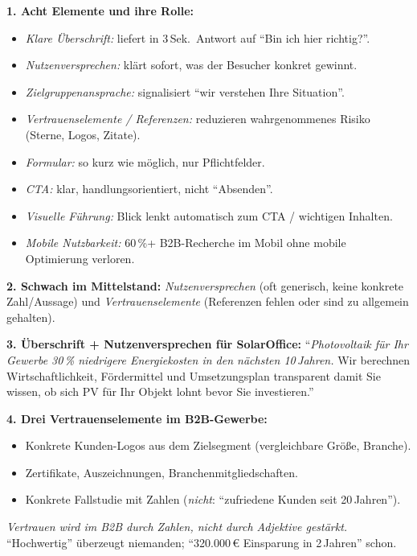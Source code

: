 \documentclass[11pt,a4paper,oneside]{article}
\begin{document}
\begin{loesungbox}
\textbf{1. Acht Elemente und ihre Rolle:}
\begin{itemize}
  \item \emph{Klare Überschrift:} liefert in 3\,Sek.\ Antwort auf ``Bin ich hier richtig?''.
  \item \emph{Nutzenversprechen:} klärt sofort, was der Besucher konkret gewinnt.
  \item \emph{Zielgruppenansprache:} signalisiert ``wir verstehen Ihre Situation''.
  \item \emph{Vertrauenselemente / Referenzen:} reduzieren wahrgenommenes Risiko (Sterne, Logos, Zitate).
  \item \emph{Formular:} so kurz wie möglich, nur Pflichtfelder.
  \item \emph{CTA:} klar, handlungsorientiert, nicht ``Absenden''.
  \item \emph{Visuelle Führung:} Blick lenkt automatisch zum CTA / wichtigen Inhalten.
  \item \emph{Mobile Nutzbarkeit:} 60\,\%+ B2B-Recherche im Mobil \textendash{} ohne mobile Optimierung verloren.
\end{itemize}

\textbf{2. Schwach im Mittelstand:}
\emph{Nutzenversprechen} (oft generisch, keine konkrete Zahl/Aussage) und \emph{Vertrauenselemente} (Referenzen fehlen oder sind zu allgemein gehalten).

\textbf{3. Überschrift + Nutzenversprechen für SolarOffice:}
``\emph{Photovoltaik für Ihr Gewerbe \textendash{} 30\,\% niedrigere Energiekosten in den nächsten 10\,Jahren.} Wir berechnen Wirtschaftlichkeit, Fördermittel und Umsetzungsplan transparent \textendash{} damit Sie wissen, ob sich PV für Ihr Objekt lohnt \textendash{} bevor Sie investieren.''

\textbf{4. Drei Vertrauenselemente im B2B-Gewerbe:}
\begin{itemize}
  \item Konkrete Kunden-Logos aus dem Zielsegment (vergleichbare Größe, Branche).
  \item Zertifikate, Auszeichnungen, Branchenmitgliedschaften.
  \item Konkrete Fallstudie mit Zahlen (\emph{nicht}: ``zufriedene Kunden seit 20\,Jahren'').
\end{itemize}

\begin{merkbox}
\emph{Vertrauen wird im B2B durch \emph{Zahlen}, nicht durch \emph{Adjektive} gestärkt.} ``Hochwertig'' überzeugt niemanden; ``320.000\,\euro{} Einsparung in 2\,Jahren'' schon.
\end{merkbox}
\end{loesungbox}
\end{document}
